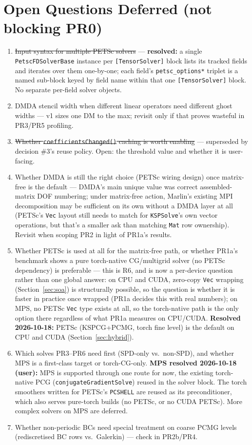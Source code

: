 \documentclass[11pt]{article}
\begin{document}
\section{Open Questions Deferred (not blocking PR0)}

\begin{enumerate}[leftmargin=*]
\item \sout{Input syntax for multiple PETSc solvers} --- \textbf{resolved:}
a single \texttt{PetscFDSolverBase} instance per \texttt{[TensorSolver]}
block lists its tracked fields and iterates over them one-by-one; each
field's \texttt{petsc\_options*} triplet is a named sub-block keyed by field
name within that one \texttt{[TensorSolver]} block. No separate per-field
solver objects.
\item DMDA stencil width when different linear operators need different
ghost widths --- v1 sizes one DM to the max; revisit only if that proves
wasteful in PR3/PR5 profiling.
\item \sout{Whether \texttt{coefficientsChanged()} caching is worth
enabling} --- superseded by decision \#3's reuse policy. Open: the threshold
value and whether it is user-facing.
\item Whether DMDA is still the right choice (PETSc wiring design) once
matrix-free is the default --- DMDA's main unique value was correct
assembled-matrix DOF numbering; under matrix-free action, Marlin's existing
MPI decomposition may be sufficient on its own without a DMDA layer at all
(PETSc's \texttt{Vec} layout still needs to match for \texttt{KSPSolve}'s
own vector operations, but that's a smaller ask than matching \texttt{Mat}
row ownership). Revisit when scoping PR2 in light of PR1a's results.
\item Whether PETSc is used at all for the matrix-free path, or whether
PR1a's benchmark shows a pure torch-native CG/multigrid solver (no PETSc
dependency) is preferable --- this is R6, and is now a per-device question
rather than one global answer: on CPU and CUDA, zero-copy \texttt{Vec}
wrapping (Section~\ref{sec:soa}) is structurally possible, so the question
is whether it is faster in practice once wrapped (PR1a decides this with
real numbers); on MPS, no PETSc \texttt{Vec} type exists at all, so the
torch-native path is the only option there regardless of what PR1a
measures on CPU/CUDA. \textbf{Resolved 2026-10-18:} PETSc (KSPCG+PCMG,
torch fine level) is the default on CPU and CUDA (Section~\ref{sec:hybrid}).
\item Which solves PR3--PR6 need first (SPD-only vs.\ non-SPD), and whether
MPS is a first-class target or torch-CG-only. \textbf{MPS resolved
2026-10-18 (user):} MPS is supported through one route for now, the existing
torch-native PCG (\texttt{conjugateGradientSolve}) reused in the solver block.
The torch smoothers written for PETSc's \texttt{PCSHELL} are reused as its
preconditioner, which also serves pure-torch builds (no PETSc, or no CUDA
PETSc). More complex solvers on MPS are deferred.
\item Whether non-periodic BCs need special treatment on coarse PCMG levels
(rediscretised BC rows vs.\ Galerkin) --- check in PR2b/PR4.
\end{enumerate}
\end{document}
